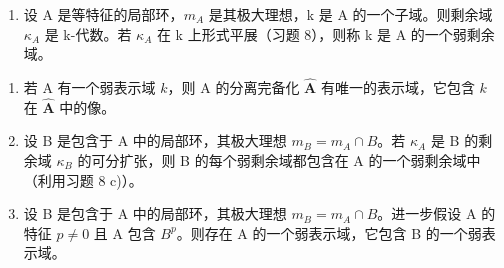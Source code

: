 \begin{enumerate}
\def\labelenumi{\arabic{enumi})}
\setcounter{enumi}{8}
\tightlist
\item
  设 A 是等特征的局部环，\(m_{A}\) 是其极大理想，k 是 A 的一个子域。则剩余域 \(\kappa_{A}\) 是 k-代数。若 \(\kappa_{A}\) 在 k 上形式平展（习题 8），则称 k 是 A 的一个弱剩余域。
\end{enumerate}

\begin{enumerate}
\def\labelenumi{\alph{enumi})}
\item
  若 A 有一个弱表示域 \(k\)，则 A 的分离完备化 \(\hat{\mathbf{A}}\) 有唯一的表示域，它包含 \(k\) 在 \(\hat{\mathbf{A}}\) 中的像。
\item
  设 B 是包含于 A 中的局部环，其极大理想 \(m_{B} = m_{A} \cap B\)。若 \(\kappa_{A}\) 是 B 的剩余域 \(\kappa_{B}\) 的可分扩张，则 B 的每个弱剩余域都包含在 A 的一个弱剩余域中（利用习题 8 c)）。
\item
  设 B 是包含于 A 中的局部环，其极大理想 \(m_{B} = m_{A} \cap B\)。进一步假设 A 的特征 \(p\ne0\) 且 A 包含 \(B^{p}\)。则存在 A 的一个弱表示域，它包含 B 的一个弱表示域。
\end{enumerate}
